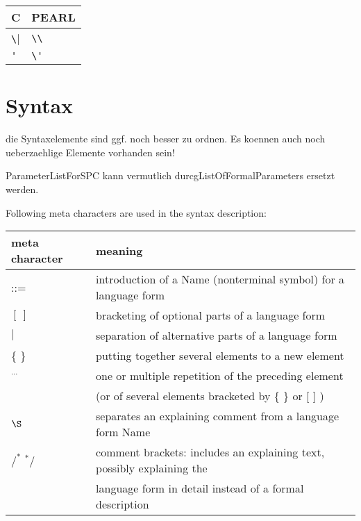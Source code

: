 \begin{tabular}{l|l}
C & PEARL \\
\hline
\verb|\| & \verb|\\| \\
\verb|'| & \verb|\'|  \\
\end{tabular}

\newpage
\section{Syntax}    %
\begin{discuss}
die Syntaxelemente sind ggf. noch besser zu ordnen.
Es koennen auch noch ueberzaehlige Elemente vorhanden sein!

ParameterListForSPC kann vermutlich durcgListOfFormalParameters ersetzt 
werden.


\end{discuss}

Following meta characters are used in the syntax description:\\ 

\begin{tabular}{ll}
meta character & meaning \\ \hline
::=            & introduction of a Name (nonterminal symbol) for a language form\\
$[\ ]$         & bracketing of optional parts of a language form \\ 
$\mid$         & separation of alternative parts of a language form\\
\{ \}          & putting together several elements to a new element\\
$^{...}$       & one or multiple repetition of the preceding element\\
               & (or of several elements bracketed by \{ \} or [ ] ) \\
$\S $          & separates an explaining comment from a language form Name\\
$/^*$ $^*/$    & comment brackets: 
                 includes an explaining text, possibly explaining the\\
               & language form in detail instead of a formal description\\
\end{tabular}

